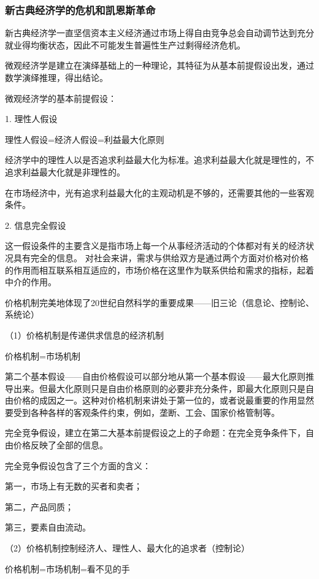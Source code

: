 \documentclass{article}
\begin{document}
\subsubsection{新古典经济学的危机和凯恩斯革命}
新古典经济学一直坚信资本主义经济通过市场上得自由竞争总会自动调节达到充分就业得均衡状态，因此不可能发生普遍性生产过剩得经济危机。

微观经济学是建立在演绎基础上的一种理论，其特征为从基本前提假设出发，通过数学演绎推理，得出结论。

微观经济学的基本前提假设：

1. 理性人假设

理性人假设=经济人假设=利益最大化原则

经济学中的理性人以是否追求利益最大化为标准。追求利益最大化就是理性的，不追求利益最大化就是非理性的。

在市场经济中，光有追求利益最大化的主观动机是不够的，还需要其他的一些客观条件。

\hspace*{\fill}

2. 信息完全假设

这一假设条件的主要含义是指市场上每一个从事经济活动的个体都对有关的经济状况具有完全的信息。 对社会来讲，需求与供给双方是通过两个方面对价格对价格的作用而相互联系相互适应的，市场价格在这里作为联系供给和需求的指标，起着中介的作用。

价格机制完美地体现了20世纪自然科学的重要成果——旧三论（信息论、控制论、系统论）

\hspace*{\fill}

（1）价格机制是传递供求信息的经济机制

价格机制=市场机制

第二个基本假设——自由价格假设可以部分地从第一个基本假设——最大化原则推导出来。但最大化原则只是自由价格原则的必要非充分条件，即最大化原则只是自由价格的成因之一。这种对价格机制来讲处于第一位的，或者说最重要的作用显然要受到各种各样的客观条件约束，例如，垄断、工会、国家价格管制等。

完全竞争假设，建立在第二大基本前提假设之上的子命题：在完全竞争条件下，自由价格反映了全部的信息。

完全竞争假设包含了三个方面的含义：

第一，市场上有无数的买者和卖者；

第二，产品同质；

第三，要素自由流动。

（2）价格机制控制经济人、理性人、最大化的追求者（控制论）

价格机制=市场机制=看不见的手
\end{document}
